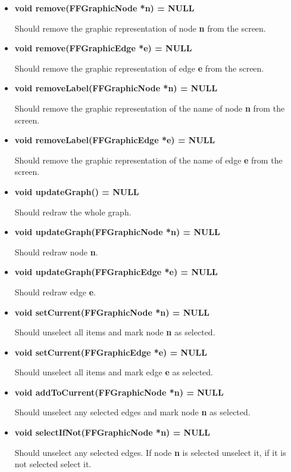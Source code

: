 \begin{itemize}
\item{\bf void remove(FFGraphicNode *n) = NULL}
  
  Should remove the graphic representation of node {\bf n} from
  the screen.

\item{\bf void remove(FFGraphicEdge *e) = NULL}
  
  Should remove the graphic representation of edge {\bf e} from
  the screen.

\item{\bf void removeLabel(FFGraphicNode *n) = NULL}
  
  Should remove the graphic representation of the name of node
  {\bf n} from the screen.

\item{\bf void removeLabel(FFGraphicEdge *e) = NULL}
  
  Should remove the graphic representation of the name of edge
  {\bf e} from the screen.

\item{\bf void updateGraph() = NULL}
  
  Should redraw the whole graph.

\item{\bf void updateGraph(FFGraphicNode *n) = NULL}
  
  Should redraw node {\bf n}.

\item{\bf void updateGraph(FFGraphicEdge *e) = NULL}
  
  Should redraw edge {\bf e}.

\item{\bf void setCurrent(FFGraphicNode *n) = NULL}
  
  Should unselect all items and mark node {\bf n} as selected.

\item{\bf void setCurrent(FFGraphicEdge *e) = NULL}
  
  Should unselect all items and mark edge {\bf e} as selected.

\item{\bf void addToCurrent(FFGraphicNode *n) = NULL}
  
  Should unselect any selected edges and mark node {\bf n} as
  selected.

\item{\bf void selectIfNot(FFGraphicNode *n) = NULL}
  
  Should unselect any selected edges. If node {\bf n} is selected
  unselect it, if it is not selected select it.


\end{itemize}
